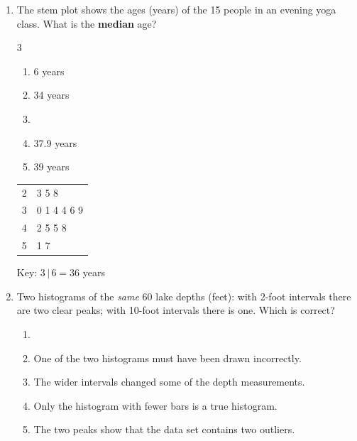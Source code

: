 \documentclass[12pt]{article}
\newenvironment{choices}
  {\begin{enumerate}[label=\textbf{(\Alph*)}, leftmargin=2.2em, itemsep=0pt, topsep=1pt]}
  {\end{enumerate}}
\newcommand{\letterroom}{\rule[-15pt]{0pt}{36pt}}
\begin{document}
\begin{enumerate}[leftmargin=1.9em, itemsep=0.03in]
  \boxguard[10]
  \item \begin{minipage}[t]{0.62\linewidth}\raggedright
        The stem plot shows the ages (years) of the 15 people in an evening yoga class. What is
        the \textbf{median} age?
        \begin{multicols}{3}
        \begin{choices}
          \item 6 years
          \item 34 years
          \item {}
          \item 37.9 years
          \item 39 years
        \end{choices}
        \end{multicols}
        \vspace{0.32in}
        \end{minipage}\hfill
        \begin{minipage}[t]{0.32\linewidth}
        \centering\small
        \begin{tabular}[t]{@{} r | l @{}}
        2 & 3 5 8 \\
        3 & 0 1 4 4 6 9 \\
        4 & 2 5 5 8 \\
        5 & 1 7 \\
        \end{tabular}\par\vspace{2pt}
        {\footnotesize Key: $3\,|\,6 = 36$ years}
        \end{minipage}

  \boxguard[10]
  \item Two histograms of the \emph{same} 60 lake depths (feet): with 2-foot intervals there are
        two clear peaks; with 10-foot intervals there is one. Which is correct?
        \begin{choices}
          \item {}
          \item One of the two histograms must have been drawn incorrectly.
          \item The wider intervals changed some of the depth measurements.
          \item Only the histogram with fewer bars is a true histogram.
          \item The two peaks show that the data set contains two outliers.
                \hfill{}\letterroom
        \end{choices}


\end{enumerate}
\end{document}

